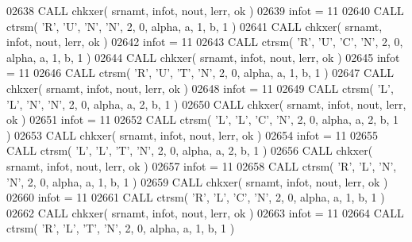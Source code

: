 \begin{DoxyCode}
02638       \textcolor{keyword}{CALL }chkxer( srnamt, infot, nout, lerr, ok )
02639       infot = 11
02640       \textcolor{keyword}{CALL }ctrsm( \textcolor{stringliteral}{'R'}, \textcolor{stringliteral}{'U'}, \textcolor{stringliteral}{'N'}, \textcolor{stringliteral}{'N'}, 2, 0, alpha, a, 1, b, 1 )
02641       \textcolor{keyword}{CALL }chkxer( srnamt, infot, nout, lerr, ok )
02642       infot = 11
02643       \textcolor{keyword}{CALL }ctrsm( \textcolor{stringliteral}{'R'}, \textcolor{stringliteral}{'U'}, \textcolor{stringliteral}{'C'}, \textcolor{stringliteral}{'N'}, 2, 0, alpha, a, 1, b, 1 )
02644       \textcolor{keyword}{CALL }chkxer( srnamt, infot, nout, lerr, ok )
02645       infot = 11
02646       \textcolor{keyword}{CALL }ctrsm( \textcolor{stringliteral}{'R'}, \textcolor{stringliteral}{'U'}, \textcolor{stringliteral}{'T'}, \textcolor{stringliteral}{'N'}, 2, 0, alpha, a, 1, b, 1 )
02647       \textcolor{keyword}{CALL }chkxer( srnamt, infot, nout, lerr, ok )
02648       infot = 11
02649       \textcolor{keyword}{CALL }ctrsm( \textcolor{stringliteral}{'L'}, \textcolor{stringliteral}{'L'}, \textcolor{stringliteral}{'N'}, \textcolor{stringliteral}{'N'}, 2, 0, alpha, a, 2, b, 1 )
02650       \textcolor{keyword}{CALL }chkxer( srnamt, infot, nout, lerr, ok )
02651       infot = 11
02652       \textcolor{keyword}{CALL }ctrsm( \textcolor{stringliteral}{'L'}, \textcolor{stringliteral}{'L'}, \textcolor{stringliteral}{'C'}, \textcolor{stringliteral}{'N'}, 2, 0, alpha, a, 2, b, 1 )
02653       \textcolor{keyword}{CALL }chkxer( srnamt, infot, nout, lerr, ok )
02654       infot = 11
02655       \textcolor{keyword}{CALL }ctrsm( \textcolor{stringliteral}{'L'}, \textcolor{stringliteral}{'L'}, \textcolor{stringliteral}{'T'}, \textcolor{stringliteral}{'N'}, 2, 0, alpha, a, 2, b, 1 )
02656       \textcolor{keyword}{CALL }chkxer( srnamt, infot, nout, lerr, ok )
02657       infot = 11
02658       \textcolor{keyword}{CALL }ctrsm( \textcolor{stringliteral}{'R'}, \textcolor{stringliteral}{'L'}, \textcolor{stringliteral}{'N'}, \textcolor{stringliteral}{'N'}, 2, 0, alpha, a, 1, b, 1 )
02659       \textcolor{keyword}{CALL }chkxer( srnamt, infot, nout, lerr, ok )
02660       infot = 11
02661       \textcolor{keyword}{CALL }ctrsm( \textcolor{stringliteral}{'R'}, \textcolor{stringliteral}{'L'}, \textcolor{stringliteral}{'C'}, \textcolor{stringliteral}{'N'}, 2, 0, alpha, a, 1, b, 1 )
02662       \textcolor{keyword}{CALL }chkxer( srnamt, infot, nout, lerr, ok )
02663       infot = 11
02664       \textcolor{keyword}{CALL }ctrsm( \textcolor{stringliteral}{'R'}, \textcolor{stringliteral}{'L'}, \textcolor{stringliteral}{'T'}, \textcolor{stringliteral}{'N'}, 2, 0, alpha, a, 1, b, 1 )

\end{DoxyCode}
